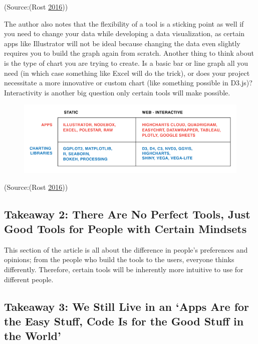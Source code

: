\documentclass[]{book}
\theoremstyle{definition}
\theoremstyle{definition}
\theoremstyle{definition}
\theoremstyle{remark}
\begin{document}
(Source:(Rost \protect\hyperlink{ref-different_tools}{2016}))

The author also notes that the flexibility of a tool is a sticking point
as well if you need to change your data while developing a data
visualization, as certain apps like Illustrator will not be ideal
because changing the data even slightly requires you to build the graph
again from scratch. Another thing to think about is the type of chart
you are trying to create. Is a basic bar or line graph all you need (in
which case something like Excel will do the trick), or does your project
necessitate a more innovative or custom chart (like something possible
in D3.js)? Interactivity is another big question only certain tools will
make possible.

\begin{figure}
\centering
\includegraphics{images/interactivity.png}
\caption{}
\end{figure}

(Source:(Rost \protect\hyperlink{ref-different_tools}{2016}))

\subsection{Takeaway 2: There Are No Perfect Tools, Just Good Tools for
People with Certain
Mindsets}\label{takeaway-2-there-are-no-perfect-tools-just-good-tools-for-people-with-certain-mindsets}

This section of the article is all about the difference in people's
preferences and opinions; from the people who build the tools to the
users, everyone thinks differently. Therefore, certain tools will be
inherently more intuitive to use for different people.

\subsection{\texorpdfstring{Takeaway 3: We Still Live in an `Apps Are
for the Easy Stuff, Code Is for the Good Stuff in the
World'}{Takeaway 3: We Still Live in an Apps Are for the Easy Stuff, Code Is for the Good Stuff in the World}}\label{takeaway-3-we-still-live-in-an-apps-are-for-the-easy-stuff-code-is-for-the-good-stuff-in-the-world}
\end{document}
